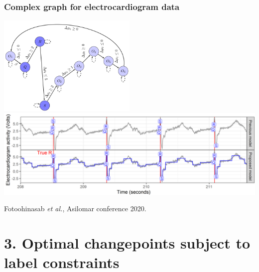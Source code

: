 \documentclass{beamer}
\begin{document}
\begin{frame}
  \frametitle{Complex graph for electrocardiogram data}
  \includegraphics[width=0.5\textwidth]{gfpop-ecg-graph}
  \includegraphics[width=\textwidth]{gfpop-ecg-data}

  Fotoohinasab \emph{et al.}, Asilomar conference 2020.

\end{frame}

\section{3. Optimal changepoints subject to label constraints}
\end{document}
